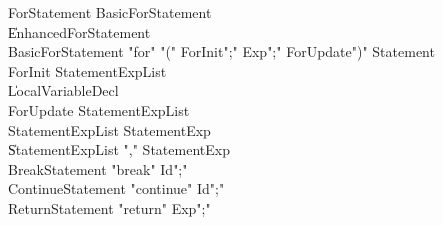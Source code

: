 {\begin{grammar}
 ForStatement  \: BasicForStatement\\
    \| EnhancedForStatement\\
 BasicForStatement  \: \xcd"for" \xcd"(" ForInit\opt \xcd";" Exp\opt \xcd";" ForUpdate\opt \xcd")" Statement\\
 ForInit  \: StatementExpList\\
    \| LocalVariableDecl\\
 ForUpdate  \: StatementExpList\\
 StatementExpList  \: StatementExp\\
    \| StatementExpList \xcd"," StatementExp\\
 BreakStatement  \: \xcd"break" Id\opt \xcd";"\\
 ContinueStatement  \: \xcd"continue" Id\opt \xcd";"\\
 ReturnStatement  \: \xcd"return" Exp\opt \xcd";"\\
\end{grammar}

\begin{grammar}


\end{grammar}}
